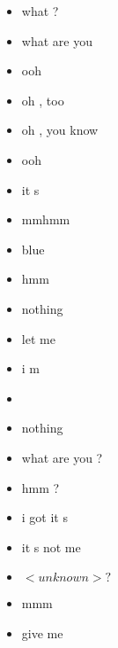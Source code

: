 \begin{multicols}{2}
\begin{itemize}
		\item what ?
		\item what are you
		\item ooh
		\item oh , too
		\item oh , you know
		\item ooh
		\item it s
		\item mmhmm
		\item blue
		\item hmm
		\item nothing
		\item let me
		\item i m
		\item
		\item nothing
		\item what are you ?
		\item hmm ?
		\item i got it s
		\item it s not me
		\item $<unknown> ?$
		\item mmm
		\item give me
	\end{itemize}
\end{multicols}

